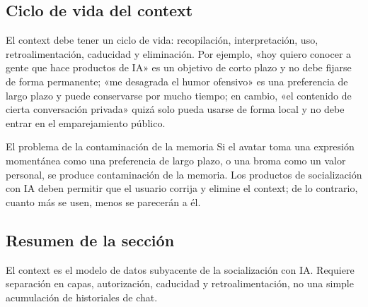 \subsection{Ciclo de vida del context}

El context debe tener un ciclo de vida: recopilación, interpretación, uso, retroalimentación, caducidad y eliminación. Por ejemplo, «hoy quiero conocer a gente que hace productos de IA» es un objetivo de corto plazo y no debe fijarse de forma permanente; «me desagrada el humor ofensivo» es una preferencia de largo plazo y puede conservarse por mucho tiempo; en cambio, «el contenido de cierta conversación privada» quizá solo pueda usarse de forma local y no debe entrar en el emparejamiento público.

\begin{warningbox}{El problema de la contaminación de la memoria}
Si el avatar toma una expresión momentánea como una preferencia de largo plazo, o una broma como un valor personal, se produce contaminación de la memoria. Los productos de socialización con IA deben permitir que el usuario corrija y elimine el context; de lo contrario, cuanto más se usen, menos se parecerán a él.
\end{warningbox}

\subsection{Resumen de la sección}

El context es el modelo de datos subyacente de la socialización con IA. Requiere separación en capas, autorización, caducidad y retroalimentación, no una simple acumulación de historiales de chat.
